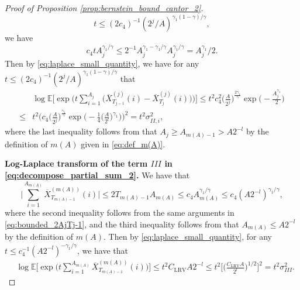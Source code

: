 \documentclass[11pt]{article}
\theoremstyle{plain}
\theoremstyle{definition}
\begin{document}
\begin{proof}[Proof of Proposition \ref{prop:bernstein_bound_cantor_2}]
    \[
        t \leq (2c_4)^{-1}(2^j/A)^{\gamma_1(1-\gamma)/\gamma},
    \]
    we have
\begin{equation*}
    c_4tA_j^{\gamma_1/\gamma} \leq 2^{-1}A_j^{\gamma_1 - \gamma_1/\gamma}A_j^{\gamma_1/\gamma} = A_j^{\gamma_1}/2.
\end{equation*}
Then by \eqref{eq:laplace_small_quantity}, we have for any $t \leq (2c_4)^{-1}(2^j/A)^{\gamma_1(1-\gamma)/\gamma}$ that
\begin{equation}\label{eq:log-laplace_termII}
\begin{aligned}
    &\log\mathbb{E}\Big[ \exp\Big(t \sum_{i = 1}^{A_j}\big(\overline{X}_{T_{j-1}}^{(j)}(i) - \overline{X}_{T_j}^{(j)}(i)\big)\Big) \Big] \leq t^2c_4^2\Big(\frac{A}{2^j}\Big)^{\frac{2\gamma_1}{\gamma}}\exp\Big(-\frac{A_j^{\gamma_1}}{2}\Big)\\
    \leq& t^2\bigg(c_4\Big(\frac{A}{2^j}\Big)^{\frac{\gamma_1}{\gamma}}\exp\Big(-\frac{1}{4}\Big(\frac{A}{2^l}\Big)^{\gamma_1}\Big)\bigg)^2 = t^2\sigma_{II,i}^2,
\end{aligned}
\end{equation}
where the last inequality follows from that $A_j \geq A_{m(A)-1} > A2^{-l}$ by the definition of $m(A)$ given in \eqref{eq:def_m(A)}.

\textbf{Log-Laplace transform of the term $III$ in \eqref{eq:decompose_partial_sum_2}.} We have that
\begin{equation*}
    \Big|\sum_{i = 1}^{A_{m(A)}}\overline{X}_{T_{m(A)-1}}^{(m(A))}(i)\Big| \leq 2T_{m(A)-1}A_{m(A)} \leq c_4A_{m(A)}^{\gamma_1/\gamma} \leq c_4(A2^{-l})^{\gamma_1/\gamma},
\end{equation*}
where the second inequality follows from the same arguments in \eqref{eq:bounded_2AjTj-1}, and the third inequality follows from that $A_{m(A)} \leq A2^{-l}$ by the definition of $m(A)$. Then by \eqref{eq:laplace_small_quantity}, for any $t \leq c_4^{-1}(A2^{-l})^{-\gamma_1/\gamma}$, we have that
\begin{equation}\label{eq:log-laplace_termIII}
\begin{aligned}
    &\log\mathbb{E}\Big[\exp\Big(t\sum_{i = 1}^{A_{m(A)}}\overline{X}_{T_{m(A)-1}}^{(m(A))}(i)\Big)\Big] \leq t^2C_{\mathrm{LRV}}A2^{-l} \leq t^2\Big[\Big(\frac{C_{\mathrm{LRV}}A}{2^l}\Big)^{1/2}\Big]^2 =  t^2\sigma_{III}^2.
\end{aligned}
\end{equation}


\end{proof}
\end{document}
